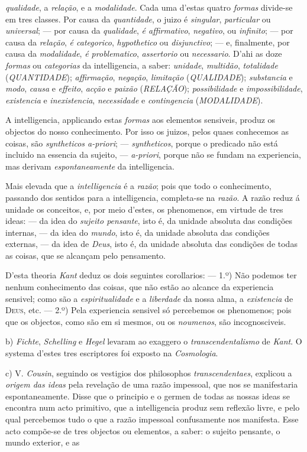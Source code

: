 \emph{qualidade}, a \emph{relação}, e a \emph{modalidade}. Cada uma d'estas quatro \emph{formas} divide-se em tres classes. Por causa da \emph{quantidade}, o juizo é \emph{singular}, \emph{particular} ou \emph{universal}; --- por causa da \emph{qualidade}, \emph{é affirmativo}, \emph{negativo}, ou \emph{infinito}; --- por causa da \emph{relação}, \emph{é categorico}, \emph{hypothetico} ou \emph{disjunctivo}; --- e, finalmente, por causa da \emph{modalidade}, \emph{é problematico}, \emph{assertorio} ou \emph{necessario}. D'ahi as doze \emph{formas} ou \emph{categorias} da intelligencia, a saber: \emph{unidade}, \emph{multidão}, \emph{totalidade} (\emph{QUANTIDADE}); \emph{affirmação}, \emph{negação}, \emph{limitação} (\emph{QUALIDADE}); \emph{substancia} e \emph{modo}, \emph{causa} e \emph{effeito}, \emph{acção} e \emph{paixão} (\emph{RELAÇÃO}); \emph{possibilidade} e \emph{impossibilidade}, \emph{existencia} e \emph{inexistencia}, \emph{necessidade} e \emph{contingencia} (\emph{MODALIDADE}).\par A intelligencia, applicando estas \emph{formas} aos elementos sensiveis, produz os objectos do nosso conhecimento. Por isso os juizos, pelos quaes conhecemos as coisas, são \emph{syntheticos a-priori}; --- \emph{syntheticos}, porque o predicado não está incluido na essencia da sujeito, --- \emph{a-priori}, porque não se fundam na experiencia, mas derivam \emph{espontaneamente} da intelligencia.\par Mais elevada que a \emph{intelligencia} é a \emph{razão}; pois que todo o conhecimento, passando dos sentidos para a intelligencia, completa-se na \emph{razão}. A razão reduz á unidade os conceitos, e, por meio d'estes, os phenomenos, em virtude de tres ideas: --- da idea do \emph{sujeito pensante}, isto é, da unidade absoluta das condições internas, --- da idea do \emph{mundo}, isto é, da unidade absoluta das condições externas, --- da idea de \emph{Deus}, isto é, da unidade absoluta das condições de todas as coisas, que se alcançam pelo pensamento.\par D'esta theoria \emph{Kant} deduz os dois seguintes corollarios: --- 1.º) Não podemos ter nenhum conhecimento das coisas, que não estão ao alcance da experiencia sensivel; como são a \emph{espiritualidade} e a \emph{liberdade} da nossa alma, a \emph{existencia} de \textsc{Deus}, etc. --- 2.º) Pela experiencia sensivel só percebemos os phenomenos; pois que os objectos, como são em si mesmos, ou os \emph{noumenos}, são incognosciveis.\par b) \emph{Fichte}, \emph{Schelling} e \emph{Hegel} levaram ao exaggero o \emph{transcendentalismo} de \emph{Kant}. O systema d'estes tres escriptores foi exposto na \emph{Cosmologia}.\par c) V. \emph{Cousin}, seguindo os vestigios dos philosophos \emph{transcendentaes}, explicou a \emph{origem das ideas} pela revelação de uma razão impessoal, que nos se manifestaria espontaneamente. Disse que o principio e o germen de todas as nossas ideas se encontra num acto primitivo, que a intelligencia produz sem reflexão livre, e pelo qual percebemos tudo o que a razão impessoal confusamente nos manifesta. Esse acto compõe-se de tres objectos ou elementos, a saber: o sujeito pensante, o mundo exterior, e as 